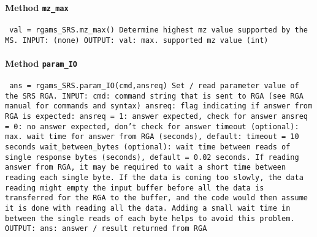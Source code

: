 \paragraph{Method \texttt{mz_max}}
\vspace{1ex}
\texttt{\newline
val = rgams_SRS.mz_max()\newline
\newline
Determine highest mz value supported by the MS.\newline
\newline
INPUT:\newline
(none)\newline
\newline
OUTPUT:\newline
val: max. supported mz value (int)\newline
\newline
}

\paragraph{Method \texttt{param_IO}}
\vspace{1ex}
\texttt{\newline
ans = rgams_SRS.param_IO(cmd,ansreq)\newline
\newline
Set / read parameter value of the SRS RGA.\newline
\newline
INPUT:\newline
cmd: command string that is sent to RGA (see RGA manual for commands and syntax)\newline
ansreq: flag indicating if answer from RGA is expected:\newline
ansreq = 1: answer expected, check for answer\newline
ansreq = 0: no answer expected, don't check for answer\newline
timeout (optional): max. wait time for answer from RGA (seconds), default: timeout = 10 seconds\newline
wait_between_bytes (optional): wait time between reads of single response bytes (seconds), default = 0.02 seconds. If reading answer from RGA, it may be required to wait a short time between reading each single byte. If the data is coming too slowly, the data reading might empty the input buffer before all the data is transferred for the RGA to the buffer, and the code would then assume it is done with reading all the data. Adding a small wait time in between the single reads of each byte helps to avoid this problem.\newline
\newline
OUTPUT:\newline
ans: answer / result returned from RGA\newline
\newline
}

